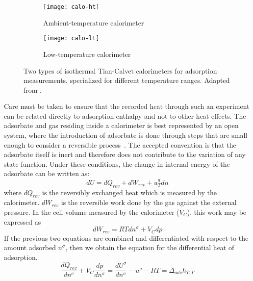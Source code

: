 \begin{figure}[htb]

	\centering
	\begin{subfigure}[b]{.45\textwidth}
		\centering
		\texttt{[image: calo-ht]}
		\caption{Ambient-temperature calorimeter}%
		\label{calo:fig:calo-ht}
	\end{subfigure}
	\begin{subfigure}[b]{.5\textwidth}
		\centering
		\texttt{[image: calo-lt]}
		\caption{Low-temperature calorimeter}%
		\label{calo:fig:calo-lt}
	\end{subfigure}%
	\caption{Two types of isothermal Tian-Calvet calorimeters
		for adsorption measurements, specialized for
		different temperature ranges.
		Adapted from \citet{llewellynGasAdsorptionMicrocalorimetry2005}.
	}%
	\label{calo:fig:calo-types}

\end{figure}

Care must be taken to ensure that
the recorded heat through such an experiment can be related directly
to adsorption enthalpy and not to other heat effects.
The adsorbate and gas residing inside a calorimeter is best
represented by an open system, where the introduction of adsorbate
is done through steps that are small enough to consider a reversible
process~\cite{rouquerolGasSolidInteractions1980}.
The accepted convention is that the adsorbate itself is inert and
therefore does not contribute to the variation of any state function.
Under these conditions,
the change in internal energy of the adsorbate can be written as:
%
\begin{equation}
	dU = dQ_{rev} + dW_{rev} + u_T^g dn
\end{equation}
%
where \(dQ_{rev}\) is the reversibly exchanged heat which is
measured by the calorimeter. \(dW_{rev}\) is the reversible work
done by the gas against the external pressure. In the cell volume measured
by the calorimeter (\(V_C\)), this work may be expressed as
%
\begin{equation}
	dW_{rev} = RT dn^{\sigma} + V_C dp
\end{equation}
%
If the previous two equations are combined and differentiated with
respect to the amount adsorbed \(n^{\sigma}\), then we obtain
the equation for the differential heat of adsorption.
%
\begin{equation}
	\frac{dQ_{rev}}{dn^{\sigma}} + V_C \frac{dp}{dn^{\sigma}} = %
	\frac{dU^{\sigma}}{dn^{\sigma}} - u^g - RT = \Delta_{ads}\dot{h}_{T, \Gamma}
\end{equation}

